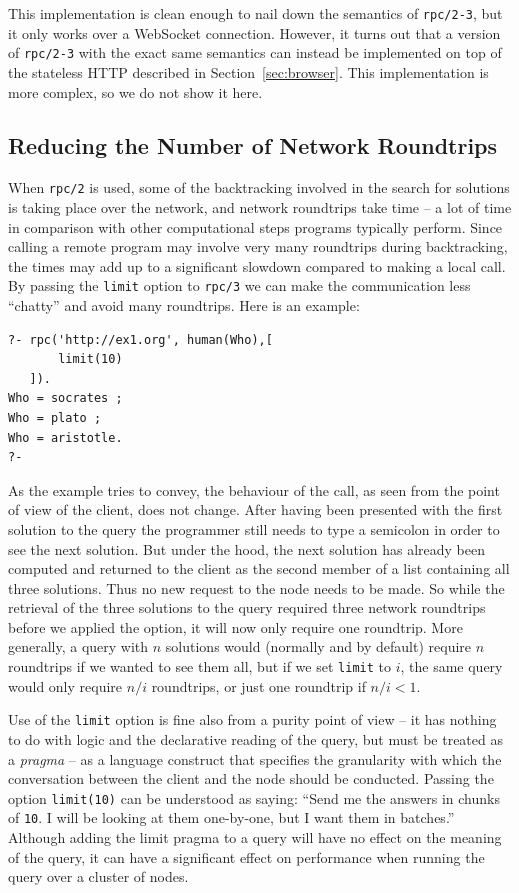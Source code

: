 \documentclass{tlp}
\begin{document}
This implementation is clean enough to nail down the semantics of \texttt{rpc/2-3}, but it only works over a WebSocket connection. However, it turns out that a version of \texttt{rpc/2-3} with the exact same semantics can instead be implemented on top of the stateless HTTP described in Section~\ref{sec:browser}. This implementation is more complex, so we do not show it here.

\subsection{Reducing the Number of Network Roundtrips}\label{sec:reducing-roundtrips}

\noindent When \texttt{rpc/2} is used, some of the backtracking involved in the search for solutions is taking place over the network, and network roundtrips take time -- a lot of time in comparison with other computational steps programs typically perform. Since calling a remote program may involve very many roundtrips during backtracking, the times may add up to a significant slowdown compared to making a local call. By passing the \texttt{limit} option to \texttt{rpc/3} we can make the communication less ``chatty'' and avoid many roundtrips. Here is an example:

\begin{lstlisting}
?- rpc('http://ex1.org', human(Who),[
       limit(10)
   ]).
Who = socrates ;
Who = plato ;
Who = aristotle.
?-
\end{lstlisting}

\noindent As the example tries to convey, the behaviour of the call, as seen from the point of view of the client, does not change. After having been presented with the first solution to the query the programmer still needs to type a semicolon in order to see the next solution. But under the hood, the next solution has already been computed and returned to the client as the second member of a list containing all three solutions. Thus no new request to the node needs to be made. So while the retrieval of the three solutions to the query required three network roundtrips before we applied the option, it will now only require one roundtrip. More generally, a query with $n$ solutions would (normally and by default) require $n$ roundtrips if we wanted to see them all, but if we set \texttt{limit} to $i$, the same query would only require $n/i$ roundtrips, or just one roundtrip if $n/i < 1$.

Use of the \texttt{limit} option is fine also from a purity point of view -- it has nothing to do with logic and the declarative reading of the query, but must be treated as a \textit{pragma} -- as a language construct that specifies the granularity with which the conversation between the client and the node should be conducted. Passing the option \texttt{limit(10)} can be understood as saying: ``Send me the answers in chunks of \texttt{10}. I will be looking at them one-by-one, but I want them in batches.'' Although adding the limit pragma to a query will have no effect on the meaning of the query, it can have a significant effect on performance when running the query over a cluster of nodes.
\end{document}
